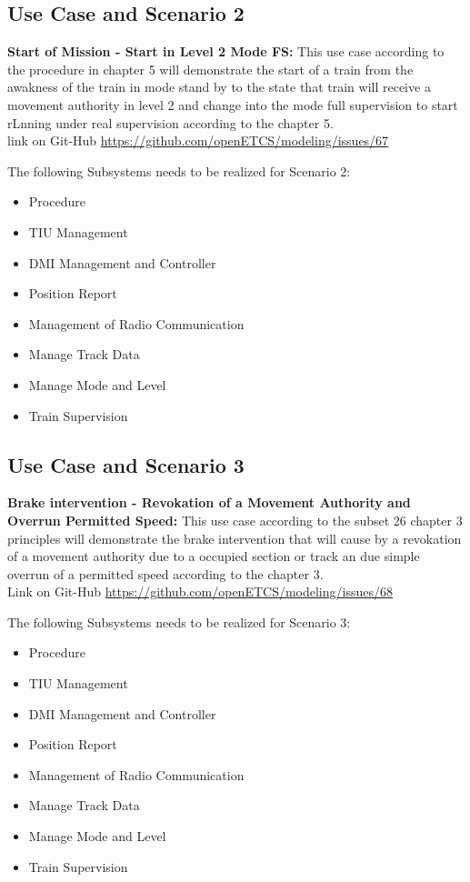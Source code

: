 \subsection{Use Case and Scenario 2}
\textbf{Start of Mission - Start in Level 2 Mode FS:}
This use case according to the procedure in chapter 5 will demonstrate the start of a train from the awakness of the train in mode stand by to the state that train will receive a movement authority in level 2 and change into the mode full supervision to start rLnning under real supervision according to the chapter 5.\\ 
link on Git-Hub \url{https://github.com/openETCS/modeling/issues/67}

The following Subsystems needs to be realized for Scenario 2:\\
\begin{itemize}
\item Procedure
\item TIU Management
\item DMI Management and Controller
\item Position Report
\item Management of Radio Communication
\item Manage Track Data
\item Manage Mode and Level
\item Train Supervision
\end{itemize}

\subsection{Use Case and Scenario 3}
\textbf{Brake intervention - Revokation of a Movement Authority and Overrun Permitted Speed:}
This use case according to the subset 26 chapter 3 principles will demonstrate the brake intervention that will cause by a revokation of a movement authority due to a occupied section or track an due simple overrun of a permitted speed  according to the chapter 3.\\ 
Link on Git-Hub \url{https://github.com/openETCS/modeling/issues/68}

The following Subsystems needs to be realized for Scenario 3:\\
\begin{itemize}
\item Procedure
\item TIU Management
\item DMI Management and Controller
\item Position Report
\item Management of Radio Communication
\item Manage Track Data
\item Manage Mode and Level
\item Train Supervision
\end{itemize}

